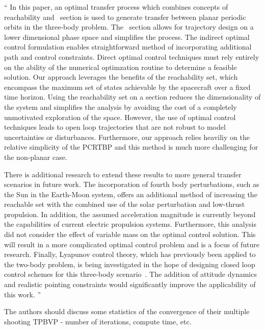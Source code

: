 \documentclass[11pt]{article}
\newenvironment{correction}{\begin{list}{}{\setlength{\leftmargin}{1cm}\setlength{\rightmargin}{1cm}}\vspace{\parsep}\item[]``}{''\end{list}}
\begin{document}
\begin{enumerate}
\begin{correction}
In this paper, an optimal transfer process which combines concepts of reachability and \Poincare~section is used to generate transfer between planar periodic orbits in the three-body problem.
The \Poincare~section allows for trajectory design on a lower dimensional phase space and simplifies the process.
The indirect optimal control formulation enables straightforward method of incorporating additional path and control constraints.
Direct optimal control techniques must rely entirely on the ability of the numerical optimzation routine to determine a feasible solution.
Our approach leverages the benefits of the reachability set, which encompass the maximum set of states achievable by the spacecraft over a fixed time horizon.
Using the reachability set on a \Poincare section reduces the dimensionality of the system and simplifies the analysis by avoiding the cost of a completely unmotivated exploration of the space.
However, the use of optimal control techniques leads to open loop trajectories that are not robust to model uncertainties or disturbances.
Furthermore, our approach relies heaviliy on the relative simplicity of the PCRTBP and this method is much more challenging for the non-planar case.

There is additional research to extend these results to more general transfer scenarios in future work.
The incorporation of fourth body perturbations, such as the Sun in the Earth-Moon system, offers an additional method of increasing the reachable set with the combined use of the solar perturbation and low-thrust propulsion.
In addition, the assumed acceleration magnitude is currently beyond the capabilities of current electric propulsion systems.
Furthermore, this analysis did not consider the effect of variable mass on the optimal control solution.
This will result in a more complicated optimal control problem and is a focus of future research.
Finally, Lyapunov control theory, which has previously been applied to the two-body problem, is being investigated in the hope of designing closed loop control schemes for this three-body scenario~\cite{chang2002}.
The addition of attitude dynamics and realistic pointing constraints would significantly improve the applicability of this work.
\end{correction}

\item 
    \begin{itshape}
The authors should discuss some statistics of the convergence of their multiple shooting TPBVP - number of iterations, compute time, etc.
\end{itshape}


\end{enumerate}
\end{document}
